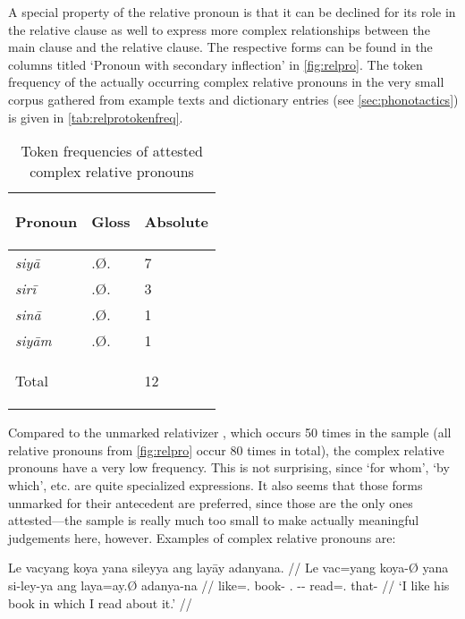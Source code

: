 A special property of the relative pronoun is that it can be declined for its 
role in the relative clause as well to express more complex relationships 
between the main clause and the relative clause. The respective forms can be 
found in the columns titled `Pronoun with secondary inflection' in 
\autoref{fig:relpro}. The token frequency of the actually occurring complex 
relative pronouns in the very small corpus gathered from example texts and 
dictionary entries (see \autoref{sec:phonotactics}) is given in 
\autoref{tab:relprotokenfreq}.

\begin{table}[tp]\centering
\caption{Token frequencies of attested complex relative pronouns}

\begin{tabu} to .75
\tableheaderfont\toprule

Pronoun & Gloss & Absolute \\

\toprule

siyā	& \Rel{}.Ø.\Loc{} & 7 \\
sirī	& \Rel{}.Ø.\Ins{} & 3 \\
sinā	& \Rel{}.Ø.\Gen{} & 1 \\
siyām	& \Rel{}.Ø.\Dat{} & 1 \\

\bottomrule

\textup{Total}	& & 12 \\

\bottomrule
\end{tabu}
\label{tab:relprotokenfreq}
\end{table}

Compared to the unmarked relativizer , which occurs 50 times in 
the sample (all relative pronouns from \autoref{fig:relpro} occur 80 times in 
total), the complex relative pronouns have a very low frequency. This is not 
surprising, since `for whom', `by which', etc. are quite specialized 
expressions. It also seems that those forms unmarked for their antecedent are 
preferred, since those are the only ones attested---the sample is really much 
too small to make actually meaningful judgements here, however. Examples of 
complex relative pronouns are:

\pex
\a\begingl[glspace=.33em]
	\gla Le vacyang koya yana sileyya ang layāy adanyana. //
	\glb Le vac=yang koya-Ø yana si-ley-ya ang laya=ay.Ø adanya-na //
	\glc \PatTI{} like=\Fsg{}.\Aarg{} book-\Top{} \TsgM{}.\Gen{} 
		\Rel{}-\PargI{}-\Loc{} \Aarg{} read=\Fsg{}.\Top{} that-\Gen{} //
	\glft `I like his book in which I read about it.' //
\endgl

